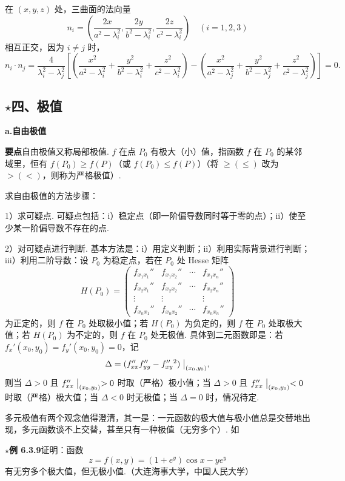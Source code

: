 \documentclass[UTF8,12pt,a4paper,fontset=fandol]{ctexart}
\begin{document}
在 $(x,y,z)$ 处，三曲面的法向量
\[
  n_i=\left(\frac{2x}{a^2-\lambda_i^2},
  \frac{2y}{b^2-\lambda_i^2},
  \frac{2z}{c^2-\lambda_i^2}\right)\quad(i=1,2,3)
\]
相互正交，因为 $i\ne j$ 时，
\[
  n_i\cdot n_j=
  \frac4{\lambda_i^2-\lambda_j^2}
  \left[
  \left(\frac{x^2}{a^2-\lambda_i^2}
  +\frac{y^2}{b^2-\lambda_i^2}
  +\frac{z^2}{c^2-\lambda_i^2}\right)
  -\left(\frac{x^2}{a^2-\lambda_j^2}
  +\frac{y^2}{b^2-\lambda_j^2}
  +\frac{z^2}{c^2-\lambda_j^2}\right)\right]=0.
\]

\subsection*{\ensuremath{\star}四、极值}

\noindent\textbf{a.\quad 自由极值}

\noindent\textbf{要点}\quad 自由极值又称局部极值. $f$ 在点 $P_0$ 有极大（小）值，指函数 $f$ 在 $P_0$ 的某邻域里，恒有 $f(P_0)\ge f(P)$（或 $f(P_0)\le f(P)$）（将 $\ge(\le)$ 改为 $>(<)$，则称为严格极值）.

求自由极值的方法步骤：

1）求可疑点. 可疑点包括：i）稳定点（即一阶偏导数同时等于零的点）；ii）使至少某一阶偏导数不存在的点.

2）对可疑点进行判断. 基本方法是：i）用定义判断；ii）利用实际背景进行判断；iii）利用二阶导数：设 $P_0$ 为稳定点，若在 $P_0$ 处 Hesse 矩阵
\[
  H(P_0)=
  \begin{pmatrix}
  f_{x_1x_1}''&f_{x_1x_2}''&\cdots&f_{x_1x_n}''\\
  f_{x_2x_1}''&f_{x_2x_2}''&\cdots&f_{x_2x_n}''\\
  \vdots&\vdots&&\vdots\\
  f_{x_nx_1}''&f_{x_nx_2}''&\cdots&f_{x_nx_n}''
  \end{pmatrix}
\]
为正定的，则 $f$ 在 $P_0$ 处取极小值；若 $H(P_0)$ 为负定的，则 $f$ 在 $P_0$ 处取极大值；若 $H(P_0)$ 为不定的，则 $f$ 在 $P_0$ 处无极值. 具体到二元函数即是：若 $f_x'(x_0,y_0)=f_y'(x_0,y_0)=0$，记
\[
  \Delta=(f_{xx}''f_{yy}''-f_{xy}''{}^2)\bigm|_{(x_0,y_0)},
\]
则当 $\Delta>0$ 且 $f_{xx}''\bigm|_{(x_0,y_0)}>0$ 时取（严格）极小值；当 $\Delta>0$ 且 $f_{xx}''\bigm|_{(x_0,y_0)}<0$ 时取（严格）极大值；当 $\Delta<0$ 时无极值；当 $\Delta=0$ 时，情况待定.

多元极值有两个观念值得澄清，其一是：一元函数的极大值与极小值总是交替地出现，多元函数谈不上交替，甚至只有一种极值（无穷多个）. 如

\noindent\textbf{\ensuremath{\star}例 6.3.9}\quad 证明：函数
\[
  z=f(x,y)=(1+e^y)\cos x-ye^y
\]
有无穷多个极大值，但无极小值.（大连海事大学，中国人民大学）
\end{document}
